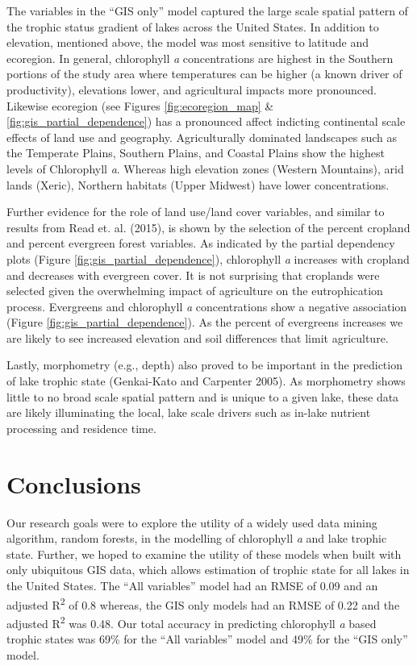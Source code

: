 \documentclass[12pt,]{article}
\begin{document}
The variables in the ``GIS only'' model captured the large scale spatial
pattern of the trophic status gradient of lakes across the United
States. In addition to elevation, mentioned above, the model was most
sensitive to latitude and ecoregion. In general, chlorophyll \emph{a}
concentrations are highest in the Southern portions of the study area
where temperatures can be higher (a known driver of productivity),
elevations lower, and agricultural impacts more pronounced. Likewise
ecoregion (see Figures \ref{fig:ecoregion_map} \&
\ref{fig:gis_partial_dependence}) has a pronounced affect indicting
continental scale effects of land use and geography. Agriculturally
dominated landscapes such as the Temperate Plains, Southern Plains, and
Coastal Plains show the highest levels of Chlorophyll \emph{a}. Whereas
high elevation zones (Western Mountains), arid lands (Xeric), Northern
habitats (Upper Midwest) have lower concentrations.

Further evidence for the role of land use/land cover variables, and
similar to results from Read et. al. (2015), is shown by the selection
of the percent cropland and percent evergreen forest variables. As
indicated by the partial dependency plots (Figure
\ref{fig:gis_partial_dependence}), chlorophyll \emph{a} increases with
cropland and decreases with evergreen cover. It is not surprising that
croplands were selected given the overwhelming impact of agriculture on
the eutrophication process. Evergreens and chlorophyll \emph{a}
concentrations show a negative association (Figure
\ref{fig:gis_partial_dependence}). As the percent of evergreens
increases we are likely to see increased elevation and soil differences
that limit agriculture.

Lastly, morphometry (e.g., depth) also proved to be important in the
prediction of lake trophic state (Genkai-Kato and Carpenter 2005). As
morphometry shows little to no broad scale spatial pattern and is unique
to a given lake, these data are likely illuminating the local, lake
scale drivers such as in-lake nutrient processing and residence time.

\section{Conclusions}\label{conclusions}

Our research goals were to explore the utility of a widely used data
mining algorithm, random forests, in the modelling of chlorophyll
\emph{a} and lake trophic state. Further, we hoped to examine the
utility of these models when built with only ubiquitous GIS data, which
allows estimation of trophic state for all lakes in the United States.
The ``All variables'' model had an RMSE of 0.09 and an adjusted
R\textsuperscript{2} of 0.8 whereas, the GIS only models had an RMSE of
0.22 and the adjusted R\textsuperscript{2} was 0.48. Our total accuracy
in predicting chlorophyll \emph{a} based trophic states was 69\% for the
``All variables'' model and 49\% for the ``GIS only'' model.
\end{document}
